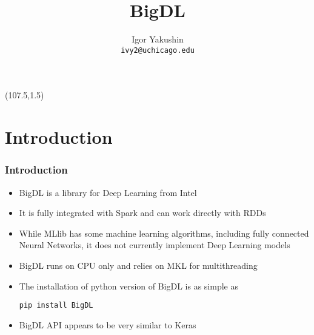 \documentclass{beamer}
\title{\huge{BigDL}}
\author{Igor Yakushin \\ \texttt{ivy2@uchicago.edu}}
\newcommand{\SPARK}{
\begin{textblock}{14}(107.5,1.5)
  \pgfuseimage{spark}
\end{textblock}
}
\begin{document}



\begin{frame}
\SPARK
\titlepage
\end{frame}

\section{Introduction}
\begin{frame}[fragile]
  \frametitle{Introduction}
  \begin{itemize}
  \item {\color{mycolordef}BigDL} is a library for Deep Learning from Intel
  \item It is fully integrated with Spark and can work directly with RDDs
  \item While MLlib has some machine learning algorithms, 
    including fully connected Neural Networks, it does not currently implement Deep Learning models
  \item BigDL runs on CPU only and relies on MKL for multithreading
  \item The installation of python version of BigDL is as simple as 
    {\color{mycolorcli}
\begin{verbatim}
pip install BigDL
\end{verbatim}
    }
  \item BigDL API appears to be very similar to Keras
  \end{itemize}
\end{frame}
\end{document}

